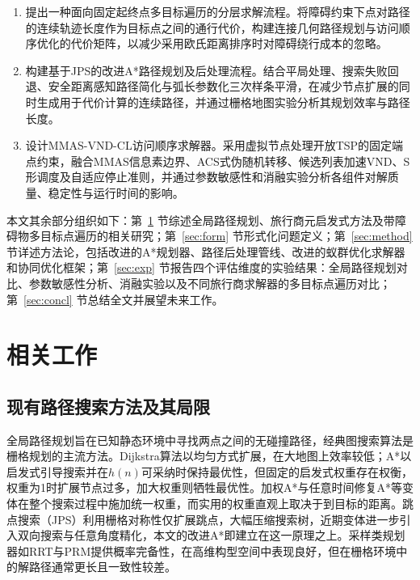 \documentclass[lettersize,journal]{IEEEtran}
\begin{document}
\begin{enumerate}

\item 提出一种面向固定起终点多目标遍历的分层求解流程。将障碍约束下点对路径的连续轨迹长度作为目标点之间的通行代价，构建连接几何路径规划与访问顺序优化的代价矩阵，以减少采用欧氏距离排序时对障碍绕行成本的忽略。

\item 构建基于JPS的改进A*路径规划及后处理流程。结合平局处理、搜索失败回退、安全距离感知路径简化与弧长参数化三次样条平滑，在减少节点扩展的同时生成用于代价计算的连续路径，并通过栅格地图实验分析其规划效率与路径长度。

\item 设计MMAS-VND-CL访问顺序求解器。采用虚拟节点处理开放TSP的固定端点约束，融合MMAS信息素边界、ACS式伪随机转移、候选列表加速VND、S形调度及自适应停止准则，并通过参数敏感性和消融实验分析各组件对解质量、稳定性与运行时间的影响。

\end{enumerate}

本文其余部分组织如下：第~\textcolor{blue}{\ref{sec:related}} 节综述全局路径规划、旅行商元启发式方法及带障碍物多目标点遍历的相关研究；第~\textcolor{blue}{\ref{sec:form}} 节形式化问题定义；第~\textcolor{blue}{\ref{sec:method}} 节详述方法论，包括改进的A*规划器、路径后处理管线、改进的蚁群优化求解器和协同优化框架；第~\textcolor{blue}{\ref{sec:exp}} 节报告四个评估维度的实验结果：全局路径规划对比、参数敏感性分析、消融实验以及不同旅行商求解器的多目标点遍历对比；第~\textcolor{blue}{\ref{sec:concl}} 节总结全文并展望未来工作。

\section{相关工作}

\label{sec:related}

\subsection{现有路径搜索方法及其局限}

全局路径规划旨在已知静态环境中寻找两点之间的无碰撞路径，经典图搜索算法是栅格规划的主流方法\textcolor{blue}{\cite{ref33,ref34,ref35}}。Dijkstra算法以均匀方式扩展，在大地图上效率较低\textcolor{blue}{\cite{ref6}}；A*以启发式引导搜索并在$h(n)$可采纳时保持最优性\textcolor{blue}{\cite{ref5}}，但固定的启发式权重存在权衡，权重为1时扩展节点过多，加大权重则牺牲最优性\textcolor{blue}{\cite{ref8}}。加权A*与任意时间修复A*等变体在整个搜索过程中施加统一权重\textcolor{blue}{\cite{ref8,ref10}}，而实用的权重直观上取决于到目标的距离。跳点搜索（JPS）利用栅格对称性仅扩展跳点，大幅压缩搜索树\textcolor{blue}{\cite{ref11,ref12,ref44}}，近期变体进一步引入双向搜索与任意角度精化\textcolor{blue}{\cite{ref13,ref14,ref15}}，本文的改进A*即建立在这一原理之上。采样类规划器如RRT\textcolor{blue}{\cite{ref7}}与PRM提供概率完备性，在高维构型空间中表现良好，但在栅格环境中的解路径通常更长且一致性较差。
\end{document}
